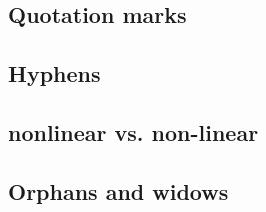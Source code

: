 \subsection{Quotation marks}
\subsection{Hyphens}
\subsection{nonlinear vs. non-linear}
\subsection{Orphans and widows}
